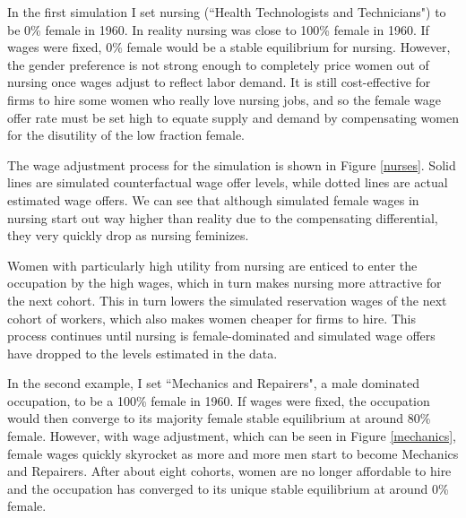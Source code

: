 \documentclass[12pt]{article}
\begin{document}

In the first simulation I set nursing (``Health Technologists and Technicians") to be 0\% female in 1960. In reality nursing was close to 100\% female in 1960. If wages were fixed, 0\% female would be a stable equilibrium for nursing. However, the gender preference is not strong enough to completely price women out of nursing once wages adjust to reflect labor demand. It is still cost-effective for firms to hire some women who really love nursing jobs, and so the female wage offer rate must be set high to equate supply and demand by compensating women for the disutility of the low fraction female.


The wage adjustment process for the simulation is shown in Figure \ref{nurses}. Solid lines are simulated counterfactual wage offer levels, while dotted lines are actual estimated wage offers. We can see that although simulated female wages in nursing start out way higher than reality due to the compensating differential, they very quickly drop as nursing feminizes. %

Women with particularly high utility from nursing are enticed to enter the occupation by the high wages, which in turn makes nursing more attractive for the next cohort. This in turn lowers the simulated reservation wages of the next cohort of workers, which also makes women cheaper for firms to hire. This process continues until nursing is female-dominated and simulated wage offers have dropped to the levels estimated in the data.

In the second example, I set ``Mechanics and Repairers", a male dominated occupation, to be a 100\% female in 1960. If wages were fixed, the occupation would then converge to its majority female stable equilibrium at around 80\% female. However, with wage adjustment, which can be seen in Figure \ref{mechanics}, female wages quickly skyrocket as more and more men start to become Mechanics and Repairers. After about eight cohorts, women are no longer affordable to hire and the occupation has converged to its unique stable equilibrium at around 0\% female.
\end{document}
